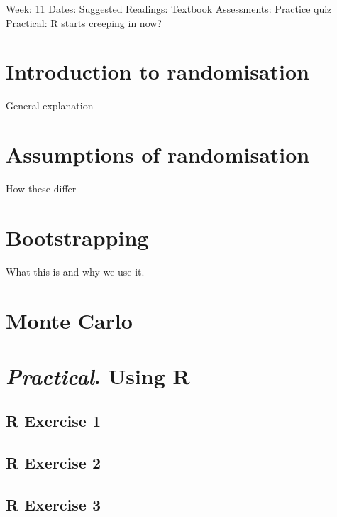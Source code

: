 \documentclass[
]{scrbook}
\begin{document}
Week: 11
Dates:
Suggested Readings: Textbook
Assessments: Practice quiz
Practical: R starts creeping in now?

\hypertarget{introduction-to-randomisation}{%
\chapter{Introduction to randomisation}\label{introduction-to-randomisation}}

General explanation

\hypertarget{assumptions-of-randomisation}{%
\chapter{Assumptions of randomisation}\label{assumptions-of-randomisation}}

How these differ

\hypertarget{bootstrapping}{%
\chapter{Bootstrapping}\label{bootstrapping}}

What this is and why we use it.

\hypertarget{monte-carlo}{%
\chapter{Monte Carlo}\label{monte-carlo}}

\hypertarget{practical.-using-r}{%
\chapter{\texorpdfstring{\emph{Practical}. Using R}{Practical. Using R}}\label{practical.-using-r}}

\hypertarget{r-exercise-1}{%
\section{R Exercise 1}\label{r-exercise-1}}

\hypertarget{r-exercise-2}{%
\section{R Exercise 2}\label{r-exercise-2}}

\hypertarget{r-exercise-3}{%
\section{R Exercise 3}\label{r-exercise-3}}
\end{document}
